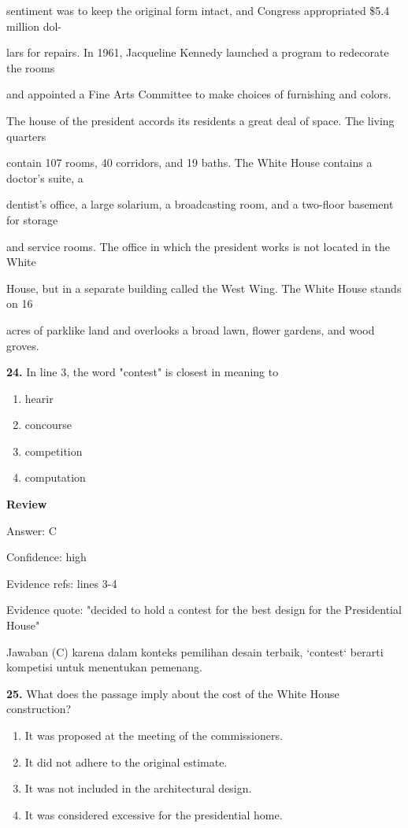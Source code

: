 \documentclass[12pt]{article}
\begin{document}
sentiment was to keep the original form intact, and Congress appropriated \$5.4 million dol-\par
lars for repairs. In 1961, Jacqueline Kennedy launched a program to redecorate the rooms\par
and appointed a Fine Arts Committee to make choices of furnishing and colors.\par
The house of the president accords its residents a great deal of space. The living quarters\par
contain 107 rooms, 40 corridors, and 19 baths. The White House contains a doctor's suite, a\par
dentist's office, a large solarium, a broadcasting room, and a two-floor basement for storage\par
and service rooms. The office in which the president works is not located in the White\par
House, but in a separate building called the West Wing. The White House stands on 16\par
acres of parklike land and overlooks a broad lawn, flower gardens, and wood groves.\par
\endgroup
\medskip
\noindent\textbf{24.} In line 3, the word "contest" is closest in meaning to
\begin{enumerate}[label=(\Alph*),leftmargin=*,itemsep=0.2em]
\item hearir
\item concourse
\item competition
\item computation
\end{enumerate}
\par
\begingroup
\setlength{\parskip}{0pt}
\setlength{\parindent}{0pt}
\textbf{Review}\par
Answer: C\par
Confidence: high\par
Evidence refs: lines 3-4\par
Evidence quote: "decided to hold a contest for the best design for the Presidential House"\par
Jawaban (C) karena dalam konteks pemilihan desain terbaik, `contest` berarti kompetisi untuk menentukan pemenang.\par
\endgroup
\par
\vspace{0.25\baselineskip}
\noindent\textbf{25.} What does the passage imply about the cost of the White House construction?
\begin{enumerate}[label=(\Alph*),leftmargin=*,itemsep=0.2em]
\item It was proposed at the meeting of the commissioners.
\item It did not adhere to the original estimate.
\item It was not included in the architectural design.
\item It was considered excessive for the presidential home.
\end{enumerate}
\end{document}
